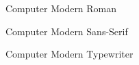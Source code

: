 \documentclass[a4paper,12pt]{article}
\begin{document}
	\begin{rmfamily}Computer Modern Roman\end{rmfamily}\par
	\begin{sffamily}Computer Modern Sans-Serif\end{sffamily}\par
	\begin{ttfamily}Computer Modern Typewriter\end{ttfamily}
	
\end{document}
